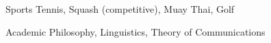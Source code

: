

\begin{cvskills}

  \cvskill
    {Sports} %
    {Tennis, Squash (competitive), Muay Thai, Golf} %

  \cvskill
    {Academic} %
    {Philosophy, Linguistics, Theory of Communications} %

\end{cvskills}
